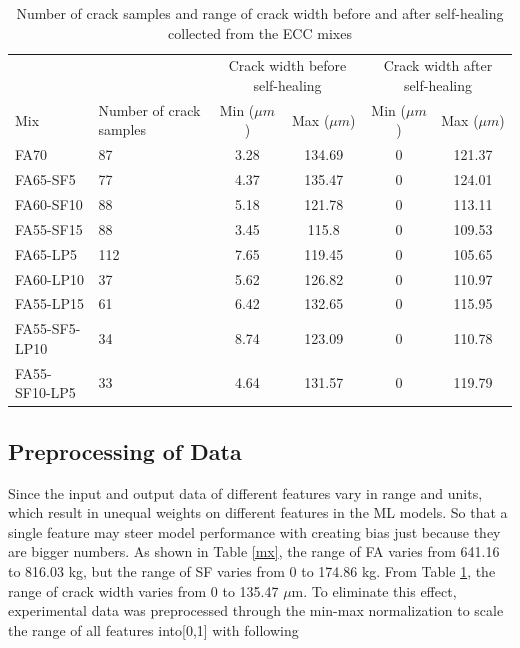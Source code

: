 \documentclass[11pt]{article}
\begin{document}
	\begin{table}[!h]
		\centering
		\caption{Number of crack samples and range of crack width before and after self-healing collected from the ECC mixes}
		\label{min}
		\begin{tabular}{p{1.02in}p{1.2in}cccc}
			\toprule
			&		&	\multicolumn{2}{p{1.9in}}{Crack width before self-healing}	&	\multicolumn{2}{p{1.8in}}{Crack width after self-healing}	\\ \cmidrule(r){3-6}
			Mix	&	Number of crack samples	&	Min	($\mu m$) &	Max ($\mu m$)	&	Min ($\mu m$)	&	Max ($\mu m$)	\\
			\midrule
			FA70	&	87	&	3.28	&	134.69	&	0	&	121.37	\\
			FA65-SF5	&	77	&	4.37	&	135.47	&	0	&	124.01	\\
			FA60-SF10	&	88	&	5.18	&	121.78	&	0	&	113.11	\\
			FA55-SF15	&	88	&	3.45	&	115.8	&	0	&	109.53	\\
			FA65-LP5	&	112	&	7.65	&	119.45	&	0	&	105.65	\\
			FA60-LP10	&	37	&	5.62	&	126.82	&	0	&	110.97	\\
			FA55-LP15	&	61	&	6.42	&	132.65	&	0	&	115.95	\\
			FA55-SF5-LP10	&	34	&	8.74	&	123.09	&	0	&	110.78	\\
			FA55-SF10-LP5	&	33	&	4.64	&	131.57	&	0	&	119.79	\\
			\bottomrule
		\end{tabular}
	\end{table}
	

	
	\subsection{Preprocessing of Data}
	
	Since the input and output data of different features vary in range and units, which result in unequal weights on different features in the ML models. So that a single feature may steer model performance with creating bias just because they are bigger numbers. As shown in Table \ref{mx}, the range of FA varies from 641.16 to 816.03 kg, but the range of SF varies from 0 to 174.86 kg. From Table \ref{min}, the range of crack width varies from 0 to 135.47 $\mu$m. To eliminate this effect, experimental data was preprocessed through the min-max normalization to scale the range of all features into[0,1] with following 
	
\end{document}
